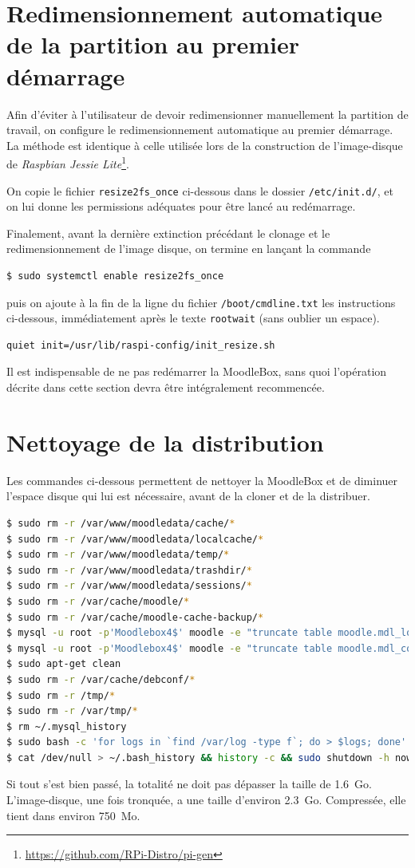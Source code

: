 \documentclass[11pt]{article}
\begin{document}
\section{Redimensionnement automatique de la partition au premier démarrage}

Afin d'éviter à l'utilisateur de devoir redimensionner manuellement la partition de travail, on configure le redimensionnement automatique au premier démarrage. La méthode est identique à celle utilisée lors de la construction de l'image-disque de \emph{Raspbian Jessie Lite}\footnote{\url{https://github.com/RPi-Distro/pi-gen}}.

On copie le fichier \lstinline{resize2fs_once} ci-dessous dans le dossier \lstinline{/etc/init.d/}, et on lui donne les permissions adéquates pour être lancé au redémarrage.


Finalement, avant la dernière extinction précédant le clonage et le redimensionnement de l'image disque, on termine en lançant la commande
\begin{lstlisting}[language=bash]
$ sudo systemctl enable resize2fs_once
\end{lstlisting}
puis on ajoute à la fin de la ligne du fichier \lstinline{/boot/cmdline.txt} les instructions ci-dessous, immédiatement après le texte \lstinline{rootwait} (sans oublier un espace).
\begin{lstlisting}[language=bash]
quiet init=/usr/lib/raspi-config/init_resize.sh
\end{lstlisting}

Il est indispensable de ne pas redémarrer la MoodleBox, sans quoi l'opération décrite dans cette section devra être intégralement recommencée.

\section{Nettoyage de la distribution}

Les commandes ci-dessous permettent de nettoyer la MoodleBox et de diminuer l'espace disque qui lui est nécessaire, avant de la cloner et de la distribuer.

\begin{lstlisting}[language=bash]
$ sudo rm -r /var/www/moodledata/cache/*
$ sudo rm -r /var/www/moodledata/localcache/*
$ sudo rm -r /var/www/moodledata/temp/*
$ sudo rm -r /var/www/moodledata/trashdir/*
$ sudo rm -r /var/www/moodledata/sessions/*
$ sudo rm -r /var/cache/moodle/*
$ sudo rm -r /var/cache/moodle-cache-backup/*
$ mysql -u root -p'Moodlebox4$' moodle -e "truncate table moodle.mdl_logstore_standard_log"
$ mysql -u root -p'Moodlebox4$' moodle -e "truncate table moodle.mdl_config_log"
$ sudo apt-get clean
$ sudo rm -r /var/cache/debconf/*
$ sudo rm -r /tmp/*
$ sudo rm -r /var/tmp/*
$ rm ~/.mysql_history
$ sudo bash -c 'for logs in `find /var/log -type f`; do > $logs; done'
$ cat /dev/null > ~/.bash_history && history -c && sudo shutdown -h now
\end{lstlisting}

Si tout s'est bien passé, la totalité ne doit pas dépasser la taille de 1.6~Go. L'image-disque, une fois tronquée, a une taille d'environ 2.3~Go. Compressée, elle tient dans environ 750~Mo.
\end{document}
